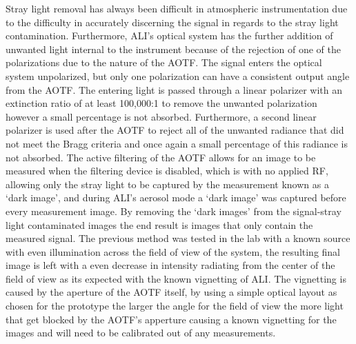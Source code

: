 \documentclass[12pt]{article}
\begin{document}
Stray light removal has always been difficult in atmospheric instrumentation due to the difficulty in accurately discerning the signal in regards to the stray light contamination. Furthermore, ALI's optical system has the further addition of unwanted light internal to the instrument because of the rejection of one of the polarizations due to the nature of the AOTF. The signal enters the optical system unpolarized, but only one polarization can have a consistent output angle from the AOTF. The entering light is passed through a linear polarizer with an extinction ratio of at least 100,000:1 to remove the unwanted polarization however a small percentage is not absorbed. Furthermore, a second linear polarizer is used after the AOTF to reject all of the unwanted radiance that did not meet the Bragg criteria and once again a small percentage of this radiance is not absorbed. The active filtering of the AOTF allows for an image to be measured when the filtering device is disabled, which is with no applied RF, allowing only the stray light to be captured by the measurement known as a `dark image', and during ALI's aerosol mode a `dark image' was captured before every measurement image. By removing the `dark images' from the signal-stray light contaminated images the end result is images that only contain the measured signal. The previous method was tested in the lab with a known source with even illumination across the field of view of the system, the resulting final image is left with a even decrease in intensity radiating from the center of the field of view as its expected with the known vignetting of ALI. The vignetting is caused by the aperture of the AOTF itself, by using a simple optical layout as chosen for the prototype the larger the angle for the field of view the more light that get blocked by the AOTF's apperture causing a known vignetting for the images and will need to be calibrated out of any measurements.
\end{document}
